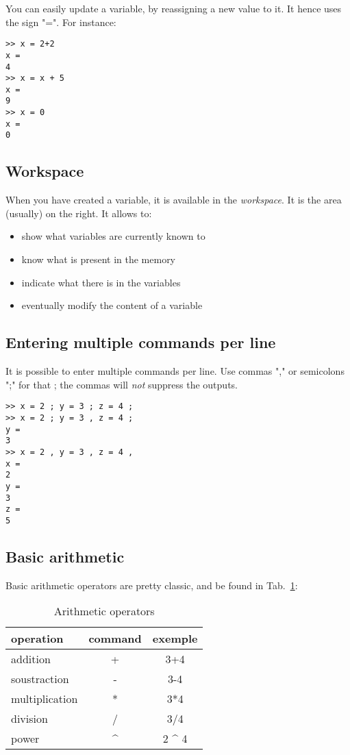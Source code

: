 			You can easily update a variable, by reassigning a new value to it. It hence uses the sign "=".
			For instance:
\begin{lstlisting}
>> x = 2+2
x = 
4
>> x = x + 5
x =
9
>> x = 0
x =
0
\end{lstlisting}

	\subsection{Workspace}
		When you have created a variable, it is available in the \emph{workspace}.
		It is the area (usually) on the right.
		It allows to:
		\begin{itemize}
			\item show what variables are currently known to \matlab
			\item know what is present in the memory
			\item indicate what there is in the variables
			\item eventually modify the content of a variable
		\end{itemize}
	
	\subsection{Entering multiple commands per line}
		It is possible to enter multiple commands per line. 
		Use commas "," or semicolons ";" for that ; the commas will \emph{not} suppress the outputs.

\begin{lstlisting}
>> x = 2 ; y = 3 ; z = 4 ;
>> x = 2 ; y = 3 , z = 4 ;
y = 
3
>> x = 2 , y = 3 , z = 4 ,
x = 
2
y = 
3
z = 
5
\end{lstlisting}

	\subsection{Basic arithmetic}
		Basic arithmetic operators are pretty classic, and be found in Tab.~\ref{tab-basic_arithmetic}:
		\begin{table}[h!]\caption{Arithmetic operators}
			\label{tab-basic_arithmetic}
			\center
			\begin{tabular}{|l|c|c|}
				\hline
				operation & command & exemple \\
				\hline
				addition & + & 3+4 \\
				soustraction & - & 3-4 \\
				multiplication & * & 3*4 \\
				division & / & 3/4 \\
				power & \^{} & 2 \^{} 4 \\
				\hline
			\end{tabular}
		\end{table}

